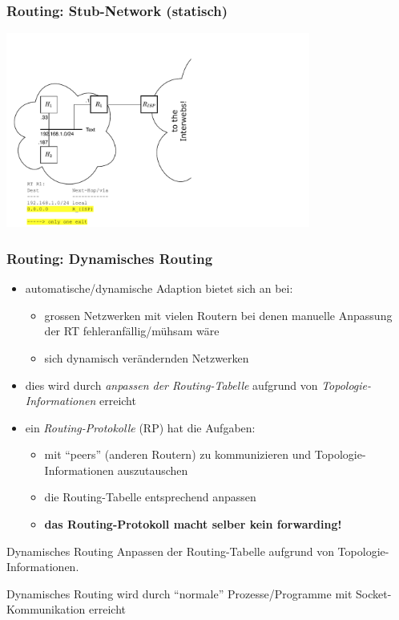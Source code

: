 \documentclass[ignorenonframetext]{beamer}
\begin{document}
\begin{frame}
\frametitle{Routing: Stub-Network (statisch)}
\begin{center}
\includegraphics[width=10cm]{network-types-stub}
\end{center}
\end{frame}


\begin{frame}
\frametitle{Routing: Dynamisches Routing}
\begin{itemize}
	\item{automatische/dynamische Adaption bietet sich an bei:\begin{small}
	    \begin{itemize}
	       \item{grossen Netzwerken mit vielen Routern bei denen manuelle Anpassung der RT fehleranf\"allig/m\"uhsam w\"are}
	       \item{sich dynamisch ver\"andernden Netzwerken}
      \end{itemize}\end{small}}
  \item{dies wird durch {\em anpassen der Routing-Tabelle} aufgrund von {\em Topologie-Informationen} erreicht}
  \item{ein {\em Routing-Protokolle} (RP) hat die Aufgaben:\begin{small}
	    \begin{itemize}
	       \item{mit ``peers'' (anderen Routern) zu kommunizieren und Topologie-Informationen auszutauschen}
	       \item{die Routing-Tabelle entsprechend anpassen}
	       \item{\textbf{das Routing-Protokoll macht selber kein forwarding!}}
      \end{itemize}\end{small}}
\end{itemize}
\begin{block}{Dynamisches Routing}
Anpassen der Routing-Tabelle aufgrund von Topologie-Informationen.

Dynamisches Routing wird durch ``normale'' Prozesse/Programme mit Socket-Kommunikation erreicht
\end{block}
\end{frame}
\end{document}
